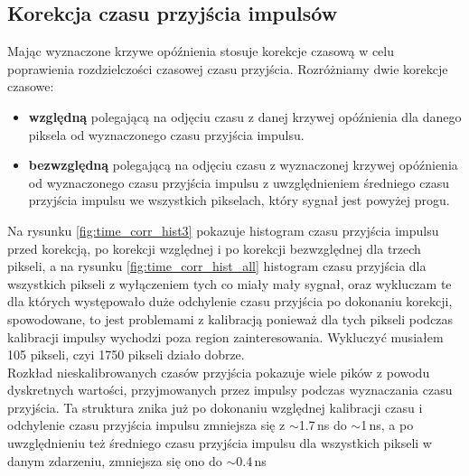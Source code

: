 \documentclass[a4paper,11pt,twoside]{article}
\begin{document}
\subsection{Korekcja czasu przyjścia impulsów}
Mając wyznaczone krzywe opóźnienia stosuje korekcje czasową w celu poprawienia rozdzielczości czasowej czasu przyjścia. Rozróżniamy dwie korekcje czasowe:
\begin{itemize}
\item {\bf{względną}} polegającą na odjęciu czasu z danej krzywej opóźnienia dla danego piksela od wyznaczonego czasu przyjścia impulsu.
\item {\bf{bezwzględną}} polegającą na odjęciu czasu z wyznaczonej krzywej opóźnienia od wyznaczonego czasu przyjścia impulsu z uwzględnieniem średniego czasu przyjścia impulsu we wszystkich pikselach, który sygnał jest powyżej progu.
\end{itemize} 
Na rysunku \ref{fig:time_corr_hist3} pokazuje histogram czasu przyjścia impulsu przed korekcją, po korekcji względnej i po korekcji bezwzględnej dla trzech pikseli, a na rysunku \ref{fig:time_corr_hist_all} histogram czasu przyjścia dla wszystkich pikseli z wyłączeniem tych co miały mały sygnał, oraz wykluczam te dla których występowało duże odchylenie czasu przyjścia po dokonaniu korekcji, spowodowane, to jest problemami z kalibracją ponieważ dla tych pikseli podczas kalibracji impulsy wychodzi poza region zainteresowania. Wykluczyć musiałem 105 pikseli, czyi 1750 pikseli działo dobrze. \\
Rozkład nieskalibrowanych czasów przyjścia pokazuje wiele pików z powodu dyskretnych wartości, przyjmowanych przez impulsy podczas wyznaczania czasu przyjścia. Ta struktura  znika już po dokonaniu  względnej kalibracji czasu i odchylenie czasu przyjścia impulsu zmniejsza się z $\sim$1.7\,ns do $\sim$1\,ns, a po uwzględnieniu też średniego czasu przyjścia impulsu dla wszystkich pikseli w danym zdarzeniu, zmniejsza się ono do $\sim$0.4\,ns
\end{document}
